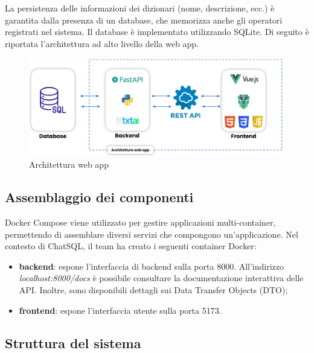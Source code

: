 \vspace{0.5\baselineskip}
\par La persistenza delle informazioni dei dizionari (nome, descrizione, ecc.) è garantita dalla presenza di un database, che memorizza anche gli operatori registrati nel sistema. Il database è implementato utilizzando SQLite. Di seguito è riportata l'architettura ad alto livello della web app.

\begin{figure}[H]
  \centering
  \includegraphics[width=\textwidth]{assets/architettura_web_app.pdf}
  \caption{Architettura web app}
\end{figure}

\subsection{Assemblaggio dei componenti}
\par Docker Compose viene utilizzato per gestire applicazioni multi-container, permettendo di assemblare diversi servizi che compongono un'applicazione. Nel contesto di ChatSQL, il team ha creato i seguenti container Docker:
\begin{itemize}
  \item \textbf{backend}: espone l'interfaccia di backend sulla porta 8000. All'indirizzo \textit{localhost:8000/docs} è possibile consultare la documentazione interattiva delle API. Inoltre, sono disponibili dettagli sui Data Transfer Objects (DTO);
  \item \textbf{frontend}: espone l'interfaccia utente sulla porta 5173.
\end{itemize}

\subsection{Struttura del sistema}


